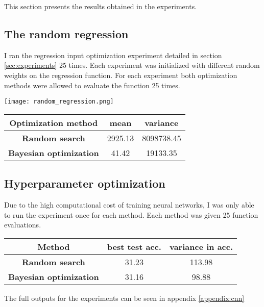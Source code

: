 
This section presents the results obtained in the experiments.

\subsection{The random regression}

I ran the regression input optimization experiment detailed in section \ref{sec:experiments} 25 times. Each experiment was initialized with different random weights on the regression function. For each experiment both optimization methods were allowed to evaluate the function 25 times.

\begin{center}
    \texttt{[image: random\_regression.png]}
    \label{image:random-regression}
\end{center}

\begin{center}
    \begin{tabular}{ c | c | c }
    \bf{Optimization method} & \bf{mean} & \bf{variance} \\
    \hline
    \bf{Random search} & 2925.13 & 8098738.45 \\
    \bf{Bayesian optimization} & 41.42 & 19133.35 \\
    \end{tabular}
    \label{table:random-regression}
\end{center}

\subsection{Hyperparameter optimization}

Due to the high computational cost of training neural networks, I was only able to run the experiment once for each method. Each method was given 25 function evaluations.

\begin{center}
    \begin{tabular}{ c | c | c }
    \bf{Method} & \bf{best test acc.} & \bf{variance in acc.} \\
    \hline
    \bf{Random search} & 31.23 & 113.98 \\
    \bf{Bayesian optimization} & 31.16 & 98.88 \\
    \end{tabular}
    \label{table:hyperparameter-opt}
\end{center}

The full outputs for the experiments can be seen in appendix \ref{appendix:cnn}



